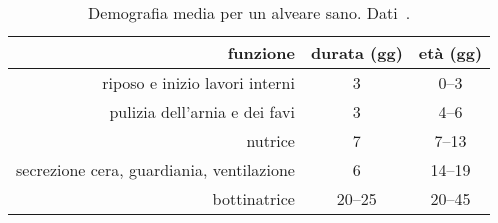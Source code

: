 \begin{table}[pbh]
    \centering
    \begin{tabular}{rcc}
        \toprule
        funzione & durata (gg) & età (gg) \\
        \midrule
        riposo e inizio lavori interni & 3 & 0--3 \\
        pulizia dell'arnia e dei favi  & 3 & 4--6 \\
        nutrice                        & 7 & 7--13 \\
        secrezione cera, guardiania, ventilazione & 6 & 14--19 \\
        bottinatrice                            & 20--25 & 20--45 \\
        \bottomrule
    \end{tabular}
    \caption{Demografia media per un alveare sano. Dati~\cite{balio}.}
    \label{tab:FDLruoliEta}
\end{table}

